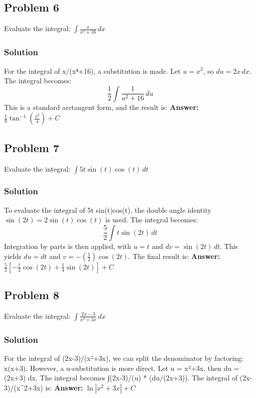 \documentclass{article}
\begin{document}
\subsection{Problem 6}
Evaluate the integral: $ \int \frac{x}{x^4+16} \,dx $
\subsubsection*{Solution}
For the integral of x/(x⁴+16), a substitution is made. Let $ u = x^2 $, so $ du = 2x \,dx $. The integral becomes:
\[ \frac{1}{2} \int \frac{1}{u^2+16} \,du \]
This is a standard arctangent form, and the result is:
\textbf{Answer:} $ \frac{1}{8}\tan^{-1}\left(\frac{x^2}{4}\right) + C $


\subsection{Problem 7}
Evaluate the integral: $ \int 5t \sin(t)\cos(t) \,dt $
\subsubsection*{Solution}
To evaluate the integral of 5t sin(t)cos(t), the double angle identity $ \sin(2t) = 2\sin(t)\cos(t) $ is used. The integral becomes:
\[ \frac{5}{2} \int t \sin(2t) \,dt \]
Integration by parts is then applied, with $ u = t $ and $ dv = \sin(2t) \,dt $. This yields $ du = dt $ and $ v = -(\frac{1}{2})\cos(2t) $. The final result is:
\textbf{Answer:} $ \frac{5}{2}\left[-\frac{t}{2}\cos(2t) + \frac{1}{4}\sin(2t)\right] + C $


\subsection{Problem 8}
Evaluate the integral: $ \int \frac{2x-3}{x^2+3x} \,dx $
\subsubsection*{Solution}
For the integral of (2x-3)/(x²+3x), we can split the denominator by factoring: x(x+3). However, a u-substitution is more direct. Let u = x²+3x, then du = (2x+3) dx. The integral becomes ∫(2x-3)/(u) * (du/(2x+3)). The integral of (2x-3)/(x^2+3x) is:
\textbf{Answer:} $ \ln|x^2+3x|+C $


\end{document}
